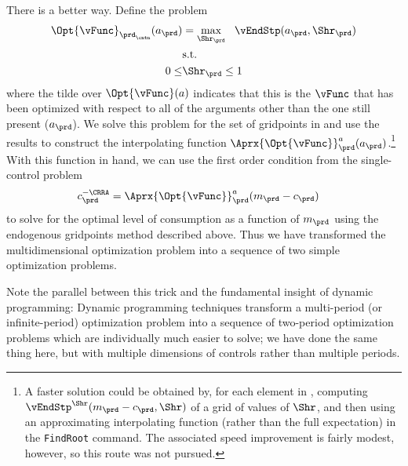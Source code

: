\documentclass[\econtexRoot/SolvingMicroDSOPs]{subfiles}
\begin{document}
There is a better way.  Define the problem
\begin{equation}\begin{gathered}\begin{aligned}
      \Opt{\vFunc}_{{\prd_\cntn}}(a_{\prd})  & = \max_{\Shr_{\prd}} ~~  \vEndStp(a_{\prd},\Shr_{\prd})
      \\      & \text{s.t.} \nonumber
      \\      0 \leq & \Shr_{\prd} \leq 1
    \end{aligned}\end{gathered}\end{equation}
where the tilde over $\Opt{\vFunc}(a)$ indicates that this is the $\vFunc$ that has been optimized with respect to all of the arguments other than the one still present ($a_{\prd}$).  We solve this problem for the set of gridpoints in  and use the results to construct the interpolating function $\Aprx{\Opt{\vFunc}}_{\prd}^{a}(a_{\prd})$.\footnote{A faster solution could be obtained by, for each element in , computing $\vEndStp^{\Shr}(m_{\prd}-c_{\prd},\Shr)$ of a grid of values of $\Shr$, and then using an approximating interpolating function (rather than the full expectation) in the \texttt{FindRoot} command.  The associated speed improvement is fairly modest, however, so this route was not pursued.}  With this function in hand, we can use the first order condition from the single-control problem
\begin{equation*}\begin{gathered}\begin{aligned}
      c_{\prd}^{-\CRRA}  & = \Aprx{\Opt{\vFunc}}_{\prd}^{a}(m_{\prd}-c_{\prd})
    \end{aligned}\end{gathered}\end{equation*}
to solve for the optimal level of consumption as a function of $m_{\prd}$ using the endogenous gridpoints method described above.  Thus we have transformed the multidimensional optimization problem into a sequence of two simple optimization problems.

Note the parallel between this trick and the fundamental insight of dynamic programming: Dynamic programming techniques transform a multi-period (or infinite-period) optimization problem into a sequence of two-period optimization problems which are individually much easier to solve; we have done the same thing here, but with multiple dimensions of controls rather than multiple periods.
\end{document}
